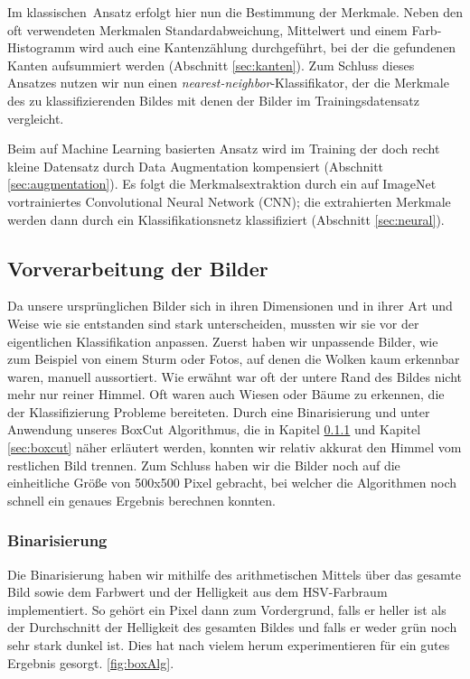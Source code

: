 \documentclass[a4,german]{article}
\begin{document}
Im \glqq klassischen\grqq\ Ansatz erfolgt hier nun die Bestimmung der Merkmale.
Neben den oft verwendeten Merkmalen Standardabweichung, Mittelwert und einem Farb-Histogramm wird auch eine Kantenzählung durchgeführt, bei der die gefundenen Kanten aufsummiert werden (Abschnitt \ref{sec:kanten}).
Zum Schluss dieses Ansatzes nutzen wir nun einen \emph{nearest-neighbor}-Klassifikator, der die Merkmale des zu klassifizierenden Bildes mit denen der Bilder im Trainingsdatensatz vergleicht.

Beim auf Machine Learning basierten Ansatz wird im Training der doch recht kleine Datensatz durch Data Augmentation kompensiert (Abschnitt \ref{sec:augmentation}).
Es folgt die Merkmalsextraktion durch ein auf ImageNet vortrainiertes Convolutional Neural Network (CNN); die extrahierten Merkmale werden dann durch ein Klassifikationsnetz klassifiziert (Abschnitt \ref{sec:neural}).



\subsection{Vorverarbeitung der Bilder}
\label{sec:vorverarbeitung}
Da unsere ursprünglichen Bilder sich in ihren Dimensionen und in ihrer Art und Weise wie sie entstanden sind stark unterscheiden, mussten wir sie vor der eigentlichen Klassifikation anpassen.
Zuerst haben wir unpassende Bilder, wie zum Beispiel von einem Sturm oder Fotos, auf denen die Wolken kaum erkennbar waren, manuell aussortiert.
Wie erwähnt war oft der untere Rand des Bildes nicht mehr nur reiner Himmel. Oft waren auch Wiesen oder Bäume zu erkennen, die der Klassifizierung Probleme bereiteten.
Durch eine Binarisierung und unter Anwendung unseres BoxCut Algorithmus, die in Kapitel \ref{sec:binary} und Kapitel \ref{sec:boxcut} näher erläutert werden, konnten wir relativ akkurat den Himmel vom restlichen Bild trennen.
Zum Schluss haben wir die Bilder noch auf die einheitliche Größe von 500x500 Pixel gebracht, bei welcher die Algorithmen noch schnell ein genaues Ergebnis berechnen konnten.

\subsubsection{Binarisierung} 
\label{sec:binary}
Die Binarisierung haben wir mithilfe des arithmetischen Mittels über das gesamte Bild sowie dem Farbwert und der Helligkeit aus dem HSV-Farbraum implementiert.
So gehört  ein Pixel dann zum Vordergrund, falls er heller ist als der Durchschnitt der Helligkeit des gesamten Bildes und falls er weder grün noch sehr stark dunkel ist.
Dies hat nach vielem herum experimentieren für ein gutes Ergebnis gesorgt. \ref{fig:boxAlg}.
\end{document}
